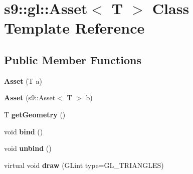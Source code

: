 \hypertarget{classs9_1_1gl_1_1Asset}{\section{s9\-:\-:gl\-:\-:\-Asset$<$ \-T $>$ \-Class \-Template \-Reference}
\label{classs9_1_1gl_1_1Asset}
}
\subsection*{\-Public \-Member \-Functions}
\begin{DoxyCompactItemize}
\item 
\hypertarget{classs9_1_1gl_1_1Asset_afdaf55d0932c489fb66dd37f23e4e1ea}{{\bfseries \-Asset} (\-T a)}\label{classs9_1_1gl_1_1Asset_afdaf55d0932c489fb66dd37f23e4e1ea}

\item 
\hypertarget{classs9_1_1gl_1_1Asset_a1fae98d00dcab688cffb2af3953b7a90}{{\bfseries \-Asset} (s9\-::\-Asset$<$ \-T $>$ b)}\label{classs9_1_1gl_1_1Asset_a1fae98d00dcab688cffb2af3953b7a90}

\item 
\hypertarget{classs9_1_1gl_1_1Asset_acd9db6e18f15e14e660061cacffa5f1a}{\-T {\bfseries get\-Geometry} ()}\label{classs9_1_1gl_1_1Asset_acd9db6e18f15e14e660061cacffa5f1a}

\item 
\hypertarget{classs9_1_1gl_1_1Asset_a249ce98e359d6edfd1ebacde2a0b9f11}{void {\bfseries bind} ()}\label{classs9_1_1gl_1_1Asset_a249ce98e359d6edfd1ebacde2a0b9f11}

\item 
\hypertarget{classs9_1_1gl_1_1Asset_a8efec5de94c4873764c37799a3247532}{void {\bfseries unbind} ()}\label{classs9_1_1gl_1_1Asset_a8efec5de94c4873764c37799a3247532}

\item 
\hypertarget{classs9_1_1gl_1_1Asset_ac6cefb6744aafd2454260ce40309ea34}{virtual void {\bfseries draw} (\-G\-Lint type=\-G\-L\-\_\-\-T\-R\-I\-A\-N\-G\-L\-E\-S)}\label{classs9_1_1gl_1_1Asset_ac6cefb6744aafd2454260ce40309ea34}

\end{DoxyCompactItemize}
